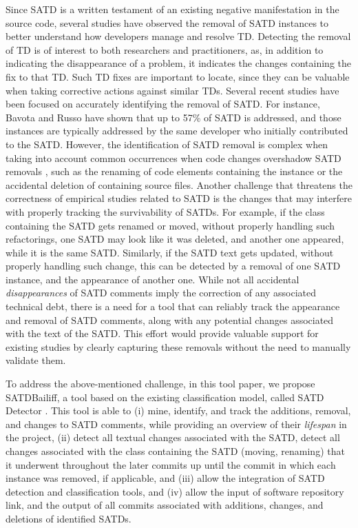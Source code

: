 \documentclass[3p]{elsarticle}
\begin{document}
Since SATD is a written testament of an existing negative manifestation in the source code, several studies have observed the removal of SATD instances to better understand how developers manage and resolve TD. Detecting the removal of TD is of interest to both researchers and practitioners, as, in addition to indicating the disappearance of a problem, it indicates the changes containing the fix to that TD. Such TD fixes are important to locate, since they can be valuable when taking corrective actions against similar TDs. Several recent studies have been focused on accurately identifying the removal of SATD. For instance, Bavota and Russo \cite{bavota2016large} have shown that up to 57\% of SATD is addressed, and those instances are typically addressed by the same developer who initially contributed to the SATD. However, the identification of SATD removal is complex when taking into account common occurrences when code changes overshadow SATD removals \cite{wehaibi2016examining}, such as the renaming of code elements containing the instance or the accidental deletion of containing source files. Another challenge that threatens the correctness of empirical studies related to SATD is the changes that may interfere with properly tracking the survivability of SATDs. For example, if the class containing the SATD gets renamed or moved, without properly handling such refactorings, one SATD may look like it was deleted, and another one appeared, while it is the same SATD. Similarly, if the SATD text gets updated, without properly handling such change, this can be detected by a removal of one SATD instance, and the appearance of another one.  While not all accidental \textit{disappearances} of SATD comments imply the correction of any associated technical debt, there is a need for a tool that can reliably track the appearance and removal of SATD comments, along with any potential changes associated with the text of the SATD. This effort would provide valuable support for existing studies by clearly capturing these removals without the need to manually validate them.

To address the above-mentioned challenge, in this tool paper, we propose SATDBailiff, a tool based on the existing classification model, called SATD Detector \cite{liu2018satd}. This tool is able to (i) mine, identify, and track the additions, removal, and changes to SATD comments, while providing an overview of their \textit{lifespan} in the project, (ii) detect all textual changes associated with the SATD, detect all changes associated with the class containing the SATD (moving, renaming) that it underwent throughout the later commits up until the commit in which each instance was removed, if applicable, and (iii) allow the integration of SATD detection and classification tools, and (iv) allow the input of software repository link, and the output of all commits associated with additions, changes, and deletions of identified SATDs.
\end{document}
